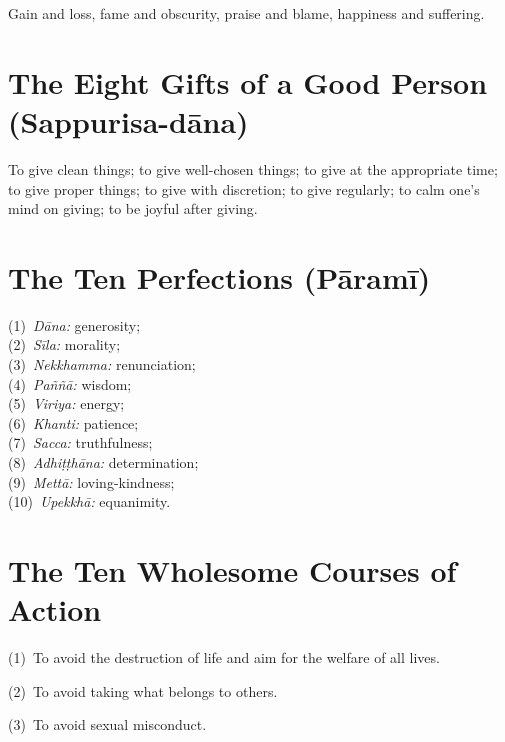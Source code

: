 Gain and loss, fame and obscurity, praise and blame, happiness and suffering.


\ifhandbookedition
\vspace*{-\baselineskip}
\fi

\section*{The Eight Gifts of a Good Person (Sappurisa-dāna)}

To give clean things; to give well-chosen things; to give at the appropriate
time; to give proper things; to give with discretion; to give regularly; to calm
one's mind on giving; to be joyful after giving.


\ifhandbookedition
\vspace*{-\baselineskip}
\fi

\section*{The Ten Perfections (Pāramī)}

(1)~\emph{Dāna:} generosity;\\
(2)~\emph{Sīla:} morality;\\
(3)~\emph{Nekkhamma:} renunciation;\\
(4)~\emph{Paññā:} wisdom;\\
(5)~\emph{Viriya:} energy;\\
(6)~\emph{Khanti:} patience;\\
(7)~\emph{Sacca:} truthfulness;\\
(8)~\emph{Adhiṭṭhāna:} determination;\\
(9)~\emph{Mettā:} loving-kindness;\\
(10)~\emph{Upekkhā:} equanimity. 

\ifhandbookedition
\clearpage
\fi

\section*{The Ten Wholesome Courses of Action}

(1)~To avoid the destruction of life and aim for the welfare of all lives.

(2)~To avoid taking what belongs to others.

(3)~To avoid sexual misconduct.

